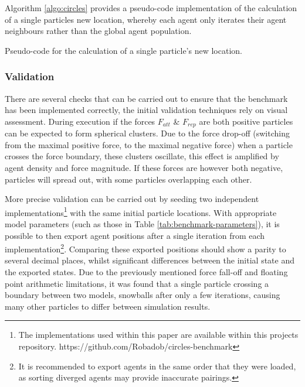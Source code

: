       Algorithm \ref{algo:circles} provides a pseudo-code implementation of the calculation of a single particles new location, whereby each agent only iterates their agent neighbours rather than the global agent population.

\vspace{0.2cm}
\begin{algorithm}

\caption{\label{algo:circles}Pseudo-code for the calculation of a single particle's new location.}
\end{algorithm}

        
    \subsubsection{Validation}
      There are several checks that can be carried out to ensure that the benchmark has been implemented correctly, the initial validation techniques rely on visual assessment. 
      During execution if the forces $F_{att}$ \& $F_{rep}$ are both positive particles can be expected to form spherical clusters. Due to the force drop-off (switching from the maximal positive force, to the maximal negative force) when a particle crosses the force boundary, these clusters oscillate, this effect is amplified by agent density and force magnitude. If these forces are however both negative, particles will spread out, with some particles overlapping each other.
      
      More precise validation can be carried out by seeding two independent implementations\footnote{The implementations used within this paper are available within this projects repository. https://github.com/Robadob/circles-benchmark} with the same initial particle locations. With appropriate model parameters (such as those in Table \ref{tab:benchmark-parameters}), it is possible to then export agent positions after a single iteration from each implementation\footnote{It is recommended to export agents in the same order that they were loaded, as sorting diverged agents may provide inaccurate pairings.}. Comparing these exported positions should show a parity to several decimal places, whilst significant differences between the initial state and the exported states. Due to the previously mentioned force fall-off and floating point arithmetic limitations, it was found that a single particle crossing a boundary between two models, snowballs after only a few iterations, causing many other particles to differ between simulation results.
      
